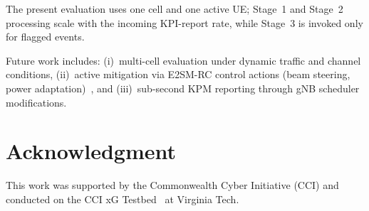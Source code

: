 \documentclass[conference]{IEEEtran}
\begin{document}
The present evaluation uses one cell and one active UE; Stage~1 and Stage~2 processing scale with the incoming KPI-report rate, while Stage~3 is invoked only for flagged events.

Future work includes: (i)~multi-cell evaluation under dynamic traffic and channel conditions, (ii)~active mitigation via E2SM-RC control actions (beam steering, power adaptation)~\cite{abdalla2022}, and (iii)~sub-second KPM reporting through gNB scheduler modifications.

\section*{Acknowledgment}
This work was supported by the Commonwealth Cyber Initiative (CCI) and conducted on the CCI xG Testbed~\cite{dasilva2025} at Virginia Tech.

\balance


\end{document}
